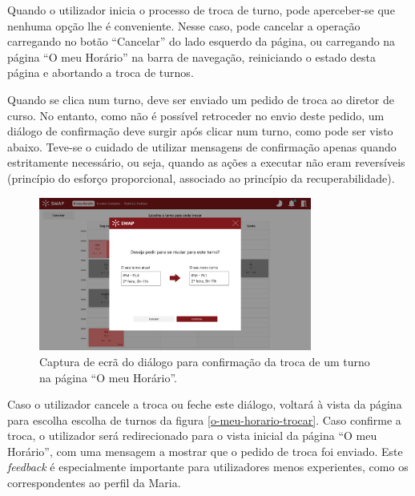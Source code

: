 \documentclass[12pt, a4paper]{article}
\begin{document}
Quando o utilizador inicia o processo de troca de turno, pode aperceber-se que nenhuma opção lhe é
conveniente. Nesse caso, pode cancelar a operação carregando no botão ``Cancelar'' do lado esquerdo
da página, ou carregando na página ``O meu Horário'' na barra de navegação, reiniciando o estado
desta página e abortando a troca de turnos.

Quando se clica num turno, deve ser enviado um pedido de troca ao diretor de curso. No entanto,
como não é possível retroceder no envio deste pedido, um diálogo de confirmação deve surgir após
clicar num turno, como pode ser visto abaixo. Teve-se o cuidado de utilizar mensagens de
confirmação apenas quando estritamente necessário, ou seja, quando as ações a executar não eram
reversíveis (princípio do esforço proporcional, associado ao princípio da recuperabilidade).

\begin{figure}[H]
    \centering
    \includegraphics[width=0.8\textwidth]{res/prototype/dialogo-confirmacao-troca.png}
    \caption{
        \onehalfspacing
        Captura de ecrã do diálogo para confirmação da troca de um turno na página
        ``O meu Horário''.
    }
    \label{dialogo-confirmacao-troca}
\end{figure}

Caso o utilizador cancele a troca ou feche este diálogo, voltará à vista da página para escolha
escolha de turnos da figura \ref{o-meu-horario-trocar}. Caso confirme a troca, o utilizador será
redirecionado para o vista inicial da página ``O meu Horário'', com uma mensagem a mostrar que o
pedido de troca foi enviado. Este \emph{feedback} é especialmente importante para utilizadores menos
experientes, como os correspondentes ao perfil da Maria.
\end{document}
